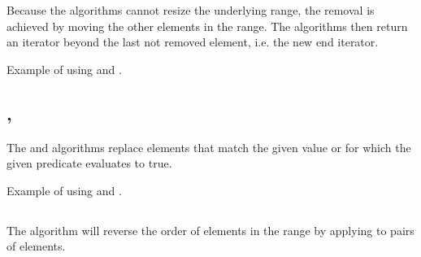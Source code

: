 Because the algorithms cannot resize the underlying range, the removal is achieved by moving the other elements in the range. The algorithms then return an iterator beyond the last not removed element, i.e. the new end iterator.


\begin{codebox}[]{\href{https://compiler-explorer.com/z/eb56eshTq}{\ExternalLink}}
\footnotesize Example of using  and .
\tcblower
{}
\end{codebox}

\subsection{\texorpdfstring{, }{\texttt{std::replace}, \texttt{std::replace\_if}}}

The  and  algorithms replace elements that match the given value or for which the given predicate evaluates to true.


\begin{codebox}[]{\href{https://compiler-explorer.com/z/aPrWhxxsj}{\ExternalLink}}
\footnotesize Example of using  and .
\tcblower
{}
\end{codebox}

\subsection{\texorpdfstring{}{\texttt{std::reverse}}}

The  algorithm will reverse the order of elements in the range by applying  to pairs of elements.


